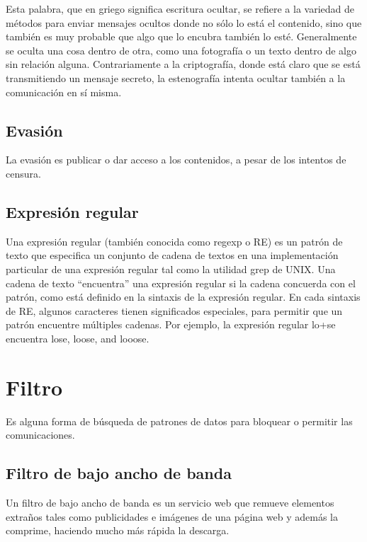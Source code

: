 Esta palabra, que en griego significa escritura ocultar, se refiere a la
variedad de métodos para enviar mensajes ocultos donde no sólo lo está
el contenido, sino que también es muy probable que algo que lo encubra
también lo esté. Generalmente se oculta una cosa dentro de otra, como
una fotografía o un texto dentro de algo sin relación alguna.
Contrariamente a la criptografía, donde está claro que se está
transmitiendo un mensaje secreto, la estenografía intenta ocultar
también a la comunicación en sí misma.

\subsection{Evasión}\label{evasiuxf3n}

La evasión es publicar o dar acceso a los contenidos, a pesar de los
intentos de censura.

\subsection{Expresión regular}\label{expresiuxf3n-regular}

Una expresión regular (también conocida como regexp o RE) es un patrón
de texto que especifica un conjunto de cadena de textos en una
implementación particular de una expresión regular tal como la utilidad
grep de UNIX. Una cadena de texto ``encuentra'' una expresión regular si
la cadena concuerda con el patrón, como está definido en la sintaxis de
la expresión regular. En cada sintaxis de RE, algunos caracteres tienen
significados especiales, para permitir que un patrón encuentre múltiples
cadenas. Por ejemplo, la expresión regular lo+se encuentra lose, loose,
and looose.

\section{Filtro}\label{filtro}

Es alguna forma de búsqueda de patrones de datos para bloquear o
permitir las comunicaciones.

\subsection{Filtro de bajo ancho de
banda}\label{filtro-de-bajo-ancho-de-banda}

Un filtro de bajo ancho de banda es un servicio web que remueve
elementos extraños tales como publicidades e imágenes de una página web
y además la comprime, haciendo mucho más rápida la descarga.

